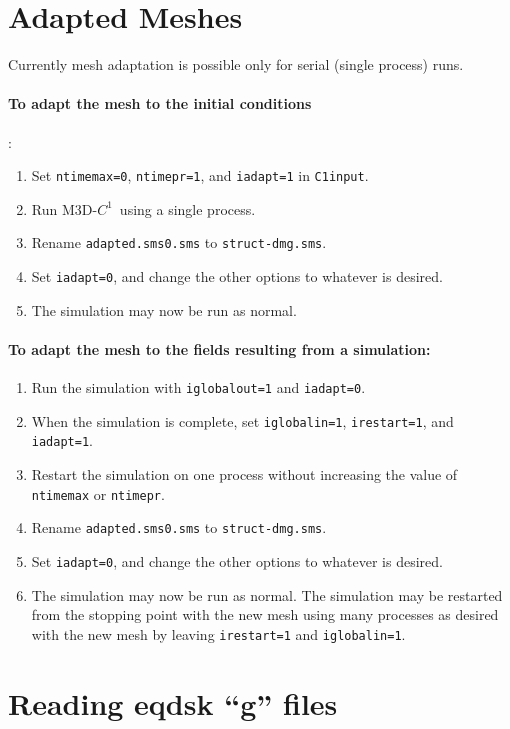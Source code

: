 \documentclass[letterpaper]{book}
\newcommand{\codename}{M3D-$C^1$}
\begin{document}
\section{Adapted Meshes}

Currently mesh adaptation is possible only for serial (single process)
runs.  

\paragraph{To adapt the mesh to the initial conditions}:
\begin{enumerate}
\item Set \texttt{ntimemax=0}, \texttt{ntimepr=1}, and
  \texttt{iadapt=1} in \texttt{C1input}.
\item Run \codename\ using a single process.  
\item Rename \texttt{adapted.sms0.sms} to \texttt{struct-dmg.sms}.
\item Set \texttt{iadapt=0}, and change the other options to whatever
  is desired.  
\item The simulation may now be run as normal.
\end{enumerate}

\paragraph{To adapt the mesh to the fields resulting from a simulation:}
\begin{enumerate}
\item Run the simulation with \texttt{iglobalout=1} and
  \texttt{iadapt=0}.
\item When the simulation is complete, set \texttt{iglobalin=1},
  \texttt{irestart=1}, and \texttt{iadapt=1}.
\item Restart the simulation on one process without increasing the
  value of \texttt{ntimemax} or \texttt{ntimepr}.
\item Rename \texttt{adapted.sms0.sms} to \texttt{struct-dmg.sms}.
\item Set \texttt{iadapt=0}, and change the other
  options to whatever is desired.
\item The simulation may now be run as normal.  The simulation may be
  restarted from the stopping point with the new mesh using many
  processes as desired with the new mesh by leaving
  \texttt{irestart=1} and \texttt{iglobalin=1}.
\end{enumerate}


\section{Reading eqdsk ``g'' files}
\end{document}
